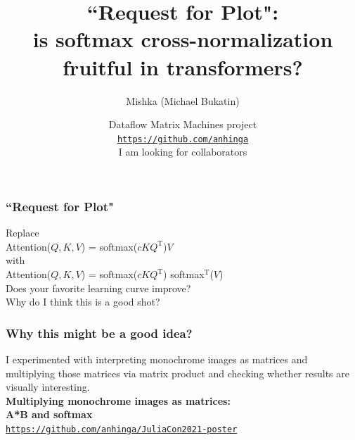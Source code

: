 \documentclass{beamer}
\newcommand{\msmagenta}[1]{{\color{mymagenta} #1}}
\begin{document}
\title{``Request for Plot":\\ is {\bf softmax cross-normalization}\\ fruitful in transformers?}
\author{Mishka (Michael Bukatin)}

\date
{\footnotesize 
Dataflow Matrix Machines project\\[2ex]

\href{https://github.com/anhinga}{\tt https://github.com/anhinga}\\[2ex]

\msmagenta{I am looking for collaborators}
}

\begin{frame}
  \titlepage
\end{frame}

\begin{frame}

\frametitle{``Request for Plot"}

Replace\\[2ex]

\hspace{0.5in}Attention($Q, K, V$) = softmax($cKQ^\text{T}$)$V$\\[2ex]

with\\[2ex]

\hspace{0.5in}Attention($Q, K, V$) = softmax($cKQ^\text{T}$)\msmagenta{softmax$^\text{T}$}($V$)\\[4ex]

Does your favorite learning curve improve?\\[8ex]

Why do I think this is a good shot?


\end{frame}

\begin{frame}

\frametitle{Why this might be a good idea?}

I experimented with interpreting monochrome images as matrices
and multiplying those matrices via matrix product and
checking whether results are visually interesting.\\[2ex]

{\bf Multiplying monochrome images as matrices:\\ A*B and softmax}\\[2ex]

\href{https://github.com/anhinga/JuliaCon2021-poster}{\tt https://github.com/anhinga/JuliaCon2021-poster}\\[2ex]


\end{frame}
\end{document}
